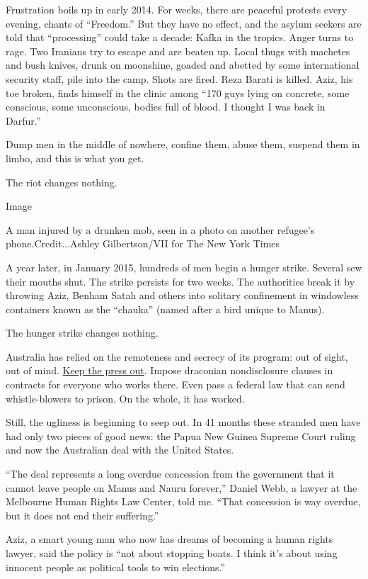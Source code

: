 Frustration boils up in early 2014. For weeks, there are peaceful
protests every evening, chants of ``Freedom.'' But they have no effect,
and the asylum seekers are told that ``processing'' could take a decade:
Kafka in the tropics. Anger turns to rage. Two Iranians try to escape
and are beaten up. Local thugs with machetes and bush knives, drunk on
moonshine, goaded and abetted by some international security staff, pile
into the camp. Shots are fired. Reza Barati is killed. Aziz, his toe
broken, finds himself in the clinic among ``170 guys lying on concrete,
some conscious, some unconscious, bodies full of blood. I thought I was
back in Darfur.''

Dump men in the middle of nowhere, confine them, abuse them, suspend
them in limbo, and this is what you get.

The riot changes nothing.

Image

A man injured by a drunken mob, seen in a photo on another refugee's
phone.Credit...Ashley Gilbertson/VII for The New York Times

A year later, in January 2015, hundreds of men begin a hunger strike.
Several sew their mouths shut. The strike persists for two weeks. The
authorities break it by throwing Aziz, Benham Satah and others into
solitary confinement in windowless containers known as the ``chauka''
(named after a bird unique to Manus).

The hunger strike changes nothing.

Australia has relied on the remoteness and secrecy of its program: out
of sight, out of mind.
\href{https://storify.com/tariromze/getting-started}{Keep the press
out}. Impose draconian nondisclosure clauses in contracts for everyone
who works there. Even pass a federal law that can send whistle-blowers
to prison. On the whole, it has worked.

Still, the ugliness is beginning to seep out. In 41 months these
stranded men have had only two pieces of good news: the Papua New Guinea
Supreme Court ruling and now the Australian deal with the United States.

``The deal represents a long overdue concession from the government that
it cannot leave people on Manus and Nauru forever,'' Daniel Webb, a
lawyer at the Melbourne Human Rights Law Center, told me. ``That
concession is way overdue, but it does not end their suffering.''

Aziz, a smart young man who now has dreams of becoming a human rights
lawyer, said the policy is ``not about stopping boats. I think it's
about using innocent people as political tools to win elections.''

